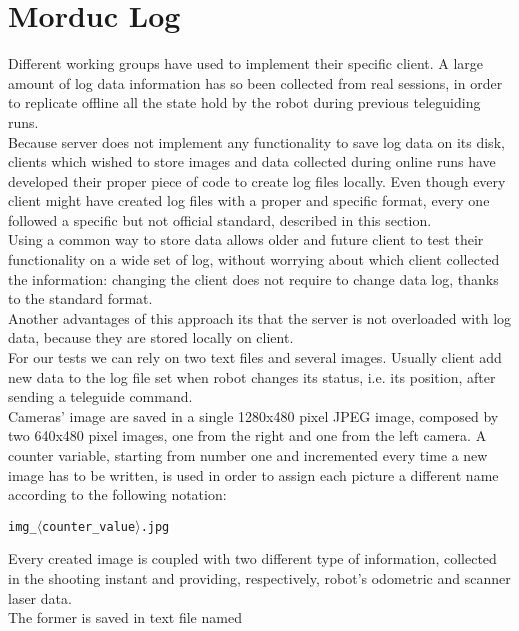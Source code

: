 \section{Morduc Log}
\label{log:morduc}

Different working groups have used \morduc{} to implement their
specific client. A large amount of log data
information has so been collected from real sessions, in
order to replicate offline all the state hold by the robot
during previous teleguiding runs.
\\
Because \morduc{} server does not implement any functionality
to save log data on its disk, clients which wished to store
images and data collected during online runs have developed their
proper piece of code to create log files locally.
Even though every client might have created log files with a proper and
specific format, every one followed a specific but not official
standard, described in this section.
\\
Using a common way to store data allows older and future client to
test their functionality on a wide set of log, without
worrying about which client collected the information:
changing the client does not require to change data log,
thanks to the standard format.
\\
Another advantages of this approach 
its that the server is not overloaded
with log data, because they are stored locally on client.
\\
For our tests we can rely on two text files and several images.
Usually client add new data to the log file set 
when robot changes its status,
i.e. its position, after sending a teleguide command.
\\
Cameras' image are saved in 
a single 1280x480 pixel JPEG image, composed by two
640x480 pixel images, one from the right and one from the left camera.
A counter variable,
starting from number one and incremented every time a new image
has to be written, is used in order to assign each picture a different
name according to the following notation:

\begin{center}
  \texttt{img\_$\langle$counter\_value$\rangle$.jpg}
\end{center}

Every created image is coupled with two different type of
information, collected in the shooting instant and providing,
respectively, robot's odometric and scanner laser data.
\\
The former is saved in text file named


